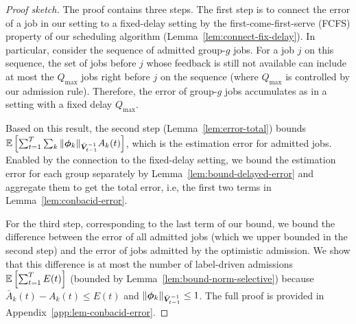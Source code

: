 \begin{proof}[Proof sketch] 
The proof contains three steps. The first step is to connect the error of a job in our setting to a fixed-delay setting by the first-come-first-serve (FCFS) property of our scheduling algorithm (Lemma~\ref{lem:connect-fix-delay}). In particular, consider the sequence of admitted group-$g$ jobs. For a job $j$ on this sequence, the set of jobs before $j$ whose feedback is still not available can include at most the $Q_{\max}$ jobs right before $j$ on the sequence (where $Q_{\max}$ is controlled by our admission rule). Therefore, the error of group-$g$ jobs accumulates as in a setting with a fixed delay $Q_{\max}$. 

Based on this result, the second step (Lemma~\ref{lem:error-total}) bounds $\mathbb E\left[\sum_{t=1}^T \sum_k \|\boldsymbol{\phi}_k\|_{\bar{\boldsymbol{V}}_{t-1}^{-1}}A_k(t)\right]$, which is the estimation error for admitted jobs. Enabled by the connection to the fixed-delay setting, we bound the estimation error for each group separately by Lemma~\ref{lem:bound-delayed-error} and aggregate them to get the total error, i.e, the first two terms in Lemma~\ref{lem:conbacid-error}. 

For the third step, corresponding to the last term of our bound, we bound the difference between the error of all admitted jobs (which we upper bounded in the second step) and the error of jobs admitted by the optimistic admission. We show that this difference is at most the number of label-driven admissions $\mathbb E\left[\sum_{t=1}^T E(t)\right]$ (bounded by Lemma~\ref{lem:bound-norm-selective}) because $\bar{A}_k(t) - A_k(t) \leq E(t)$ and $\|\boldsymbol{\phi}_k\|_{\bar{\boldsymbol{V}}_{t-1}^{-1}} \leq 1$. The full proof is provided in Appendix~\ref{app:lem-conbacid-error}.
\end{proof}